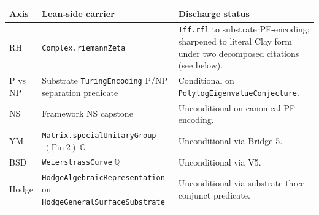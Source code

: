 \documentclass[11pt,a4paper]{amsart}
\theoremstyle{plain}
\theoremstyle{definition}
\begin{document}
\begin{center}
\footnotesize
\renewcommand{\arraystretch}{1.15}
\begin{tabular}{@{}p{1.5cm}p{4.3cm}p{6.5cm}@{}}
\toprule
\textbf{Axis} & \textbf{Lean-side carrier} & \textbf{Discharge status} \\
\midrule
RH        & \texttt{Complex.riemannZeta}                              & \texttt{Iff.rfl} to substrate PF-encoding; sharpened to literal Clay form under two decomposed citations (see below). \\
P vs NP   & Substrate \texttt{TuringEncoding} P/NP separation predicate & Conditional on \texttt{PolylogEigenvalueConjecture}. \\
NS        & Framework NS capstone                                     & Unconditional on canonical PF encoding. \\
YM        & \texttt{Matrix.specialUnitaryGroup}$~(\mathrm{Fin}~2)~\mathbb{C}$ & Unconditional via Bridge 5. \\
BSD       & \texttt{WeierstrassCurve}$~\mathbb{Q}$                    & Unconditional via V5. \\
Hodge     & \texttt{HodgeAlgebraicRepresentation} on \texttt{HodgeGeneralSurfaceSubstrate} & Unconditional via substrate three-conjunct predicate. \\
\bottomrule
\end{tabular}
\end{center}
\end{document}

